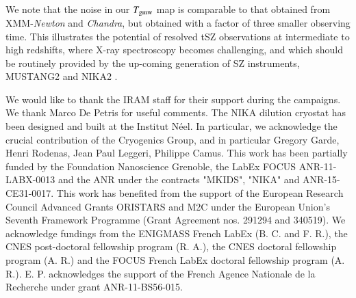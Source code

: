 \documentclass[twocolumn,traditabstract]{aa}
\begin{document}
We note that the noise in our $T_{\rm gmw}$ map  is comparable to that obtained from XMM-\textit{Newton} and \textit{Chandra}, but obtained with a factor of three smaller observing time. This illustrates the potential of resolved tSZ observations at intermediate to high redshifts, where X-ray spectroscopy becomes challenging, and which should be routinely provided by the up-coming generation of SZ instruments, MUSTANG2 \citep{Dicker2014} and NIKA2 \citep{Calvo2016,Comis2016}.

\begin{acknowledgements}
We would like to thank the IRAM staff for their support during the campaigns. 
We thank Marco De Petris for useful comments.
The NIKA dilution cryostat has been designed and built at the Institut N\'eel. In particular, we acknowledge the crucial contribution of the Cryogenics Group, and  in particular Gregory Garde, Henri Rodenas, Jean Paul Leggeri, Philippe Camus. 
This work has been partially funded by the Foundation Nanoscience Grenoble, the LabEx FOCUS ANR-11-LABX-0013 and the ANR under the contracts "MKIDS", "NIKA" and ANR-15-CE31-0017. 
This work has benefited from the support of the European Research Council Advanced Grants ORISTARS and M2C under the European Union's Seventh Framework Programme (Grant Agreement nos. 291294 and 340519).
We acknowledge fundings from the ENIGMASS French LabEx (B. C. and F. R.), the CNES post-doctoral fellowship program (R. A.),  the CNES doctoral fellowship program (A. R.) and the FOCUS French LabEx doctoral fellowship program (A. R.).
E. P. acknowledges the support of the French Agence Nationale de la Recherche under grant ANR-11-BS56-015.
\end{acknowledgements}


\end{document}
